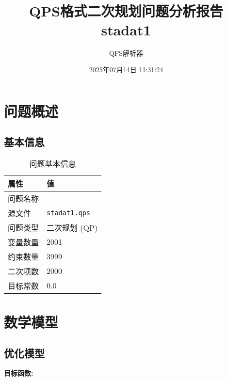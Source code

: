 \documentclass[a4paper,11pt]{article}
\title{QPS格式二次规划问题分析报告\\{\large stadat1}}
\author{QPS解析器}
\date{2025年07月14日 11:31:24}
\begin{document}
\maketitle
\tableofcontents
\newpage

\section{问题概述}
\subsection{基本信息}
\begin{table}[h!]
\centering
\begin{tabular}{ll}
\toprule
\textbf{属性} & \textbf{值} \\
\midrule
问题名称 & \texttt{} \\
源文件 & \texttt{stadat1.qps} \\
问题类型 & 二次规划 (QP) \\
变量数量 & 2001 \\
约束数量 & 3999 \\
二次项数 & 2000 \\
目标常数 & 0.0 \\
\bottomrule
\end{tabular}
\caption{问题基本信息}
\end{table}

\section{数学模型}
\subsection{优化模型}

\textbf{目标函数:}
\end{document}
